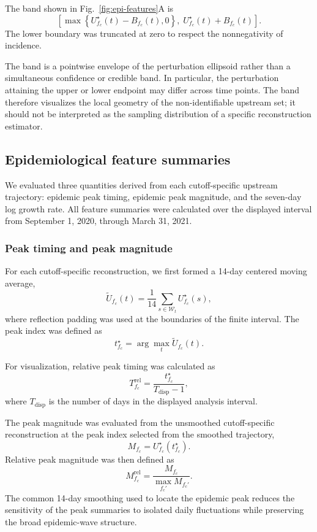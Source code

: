 The band shown in Fig.~\ref{fig:epi-features}A is
\[
\left[
\max\left\{
U^\star_{f_c}(t)-B_{f_c}(t),0
\right\},
\;
U^\star_{f_c}(t)+B_{f_c}(t)
\right].
\]
The lower boundary was truncated at zero to respect the nonnegativity of
incidence.

The band is a pointwise envelope of the perturbation ellipsoid rather than a
simultaneous confidence or credible band. In particular, the perturbation
attaining the upper or lower endpoint may differ across time points. The band
therefore visualizes the local geometry of the non-identifiable upstream set;
it should not be interpreted as the sampling distribution of a specific
reconstruction estimator.


\subsection{Epidemiological feature summaries}
\label{sec:Appendix_S4}

We evaluated three quantities derived from each cutoff-specific upstream
trajectory: epidemic peak timing, epidemic peak magnitude, and the seven-day
log growth rate. All feature summaries were calculated over the displayed
interval from September 1, 2020, through March 31, 2021.

\subsubsection{Peak timing and peak magnitude}

For each cutoff-specific reconstruction, we first formed a 14-day centered
moving average,
\[
\widetilde U_{f_c}(t)
=
\frac{1}{14}
\sum_{s\in\mathcal W_t}
U^\star_{f_c}(s),
\]
where reflection padding was used at the boundaries of the finite interval.
The peak index was defined as
\[
t^\star_{f_c}
=
\arg\max_t
\widetilde U_{f_c}(t).
\]

For visualization, relative peak timing was calculated as
\[
T^{\mathrm{rel}}_{f_c}
=
\frac{t^\star_{f_c}}
{T_{\mathrm{disp}}-1},
\]
where \(T_{\mathrm{disp}}\) is the number of days in the displayed analysis
interval.

The peak magnitude was evaluated from the unsmoothed cutoff-specific
reconstruction at the peak index selected from the smoothed trajectory,
\[
M_{f_c}
=
U^\star_{f_c}(t^\star_{f_c}).
\]
Relative peak magnitude was then defined as
\[
M^{\mathrm{rel}}_{f_c}
=
\frac{M_{f_c}}
{\max_{f_c'}M_{f_c'}}.
\]
The common 14-day smoothing used to locate the epidemic peak reduces the
sensitivity of the peak summaries to isolated daily fluctuations while
preserving the broad epidemic-wave structure.


